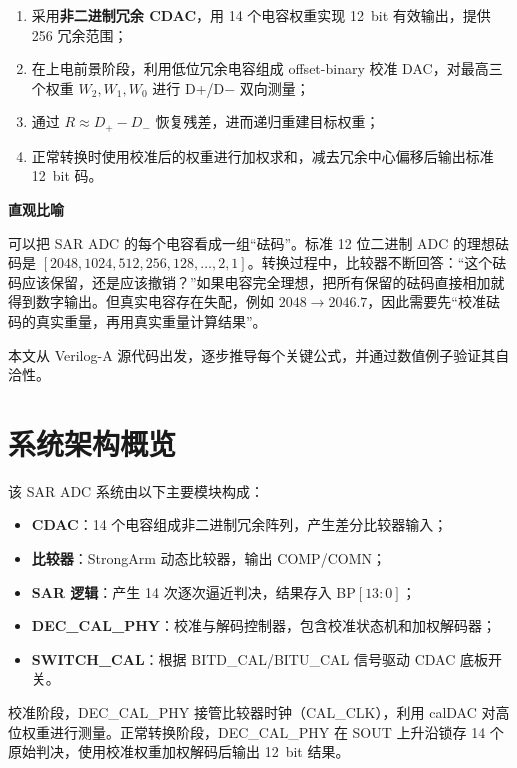 \documentclass[
  UTF8,
  a4paper,
  11pt,
  oneside,
  fontset=fandol
]{ctexrep}
\newenvironment{tipbox}[1]{%
  \begin{center}
  \begin{minipage}{0.94\textwidth}
  \colorbox{lightteal}{%
    \parbox{0.96\textwidth}{\textbf{#1}}}
  \vspace{0.35em}\par
}{%
  \end{minipage}
  \end{center}
}
\begin{document}
\begin{enumerate}[leftmargin=2em]
    \item 采用\textbf{非二进制冗余 CDAC}，用 14 个电容权重实现 \SI{12}{bit} 有效输出，提供 \SI{256}{\LSB} 冗余范围；
    \item 在上电前景阶段，利用低位冗余电容组成 offset-binary 校准 DAC，对最高三个权重 $W_2, W_1, W_0$ 进行 D+/D$-$ 双向测量；
    \item 通过 $R \approx D_+ - D_-$ 恢复残差，进而递归重建目标权重；
    \item 正常转换时使用校准后的权重进行加权求和，减去冗余中心偏移后输出标准 \SI{12}{bit} 码。
\end{enumerate}

\begin{tipbox}{直观比喻}
可以把 SAR ADC 的每个电容看成一组“砝码”。标准 12 位二进制 ADC 的理想砝码是 $[2048, 1024, 512, 256, 128, \ldots, 2, 1]$。转换过程中，比较器不断回答：“这个砝码应该保留，还是应该撤销？”如果电容完全理想，把所有保留的砝码直接相加就得到数字输出。但真实电容存在失配，例如 $2048 \to 2046.7$，因此需要先“校准砝码的真实重量，再用真实重量计算结果”。
\end{tipbox}

本文从 Verilog-A 源代码出发，逐步推导每个关键公式，并通过数值例子验证其自洽性。

\chapter{系统架构概览}

该 SAR ADC 系统由以下主要模块构成：

\begin{itemize}[leftmargin=2em]
    \item \textbf{CDAC}：14 个电容组成非二进制冗余阵列，产生差分比较器输入；
    \item \textbf{比较器}：StrongArm 动态比较器，输出 COMP/COMN；
    \item \textbf{SAR 逻辑}：产生 14 次逐次逼近判决，结果存入 BP$[13:0]$；
    \item \textbf{DEC\_CAL\_PHY}：校准与解码控制器，包含校准状态机和加权解码器；
    \item \textbf{SWITCH\_CAL}：根据 BITD\_CAL/BITU\_CAL 信号驱动 CDAC 底板开关。
\end{itemize}

校准阶段，DEC\_CAL\_PHY 接管比较器时钟（CAL\_CLK），利用 calDAC 对高位权重进行测量。正常转换阶段，DEC\_CAL\_PHY 在 SOUT 上升沿锁存 14 个原始判决，使用校准权重加权解码后输出 \SI{12}{bit} 结果。
\end{document}
